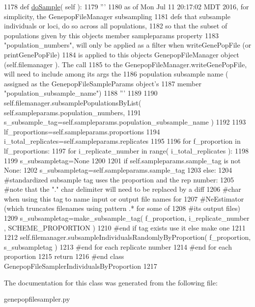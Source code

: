 \begin{DoxyCode}
1178     \textcolor{keyword}{def }\hyperlink{classnegui_1_1genepopfilesampler_1_1GenepopFileSamplerIndividualsByProportion_ad8170ea6661afa7bff72d484372209e3}{doSample}( self ):
1179         \textcolor{stringliteral}{'''}
1180 \textcolor{stringliteral}{        as of Mon Jul 11 20:17:02 MDT 2016, for simplicity, the GenepopFileManager subsampling}
1181 \textcolor{stringliteral}{        defs that subsample individuals or loci, do so across all populations,}
1182 \textcolor{stringliteral}{        so that the subset of populations given by this objects member sampleparams property }
1183 \textcolor{stringliteral}{        "population\_numbers", will only be applied as a filter when writeGenePopFile (or printGenePopFile)}
1184 \textcolor{stringliteral}{        is applied to this objects GenepopFileManager object (self.filemanager ). The call}
1185 \textcolor{stringliteral}{        to the GenepopFileManager.writeGenePopFile, will need to include among its args the }
1186 \textcolor{stringliteral}{        population subsample name ( assigned as the GenepopFileSampleParams object's}
1187 \textcolor{stringliteral}{        member "population\_subsample\_name") }
1188 \textcolor{stringliteral}{        '''}
1189 
1190         self.filemanager.subsamplePopulationsByList( self.sampleparams.population\_numbers, 
1191                 s\_subsample\_tag=self.sampleparams.population\_subsample\_name )
1192 
1193         lf\_proportions=self.sampleparams.proportions
1194         i\_total\_replicates=self.sampleparams.replicates
1195 
1196         \textcolor{keywordflow}{for} f\_proportion \textcolor{keywordflow}{in} lf\_proportions:
1197             \textcolor{keywordflow}{for} i\_replicate\_number \textcolor{keywordflow}{in} range( i\_total\_replicates ):
1198 
1199                 s\_subsampletag=\textcolor{keywordtype}{None}
1200 
1201                 \textcolor{keywordflow}{if} self.sampleparams.sample\_tag \textcolor{keywordflow}{is} \textcolor{keywordflow}{not} \textcolor{keywordtype}{None}:
1202                     s\_subsampletag=self.sampleparams.sample\_tag
1203                 \textcolor{keywordflow}{else}:
1204                     \textcolor{comment}{#standardized subsample tag uses the proportion and the rep number:}
1205                     \textcolor{comment}{#note that the "." char delimiter will need to be replaced by a diff}
1206                     \textcolor{comment}{#char when using this tag to name input or output file names for}
1207                     \textcolor{comment}{#NeEstimator (which truncates filenames using pattern .* for some of }
1208                     \textcolor{comment}{#its output files)}
1209                     s\_subsampletag=make\_subsample\_tag(  f\_proportion, i\_replicate\_number , 
      SCHEME\_PROPORTION )
1210                 \textcolor{comment}{#end if tag exists use it else make one}
1211 
1212                 self.filemanager.subsampleIndividualsRandomlyByProportion( f\_proportion, s\_subsampletag ) 
1213             \textcolor{comment}{#end for each replicate number  }
1214         \textcolor{comment}{#end for each proportion}
1215         \textcolor{keywordflow}{return}
1216 \textcolor{comment}{#end class GenepopFileSamplerIndividualsByProportion}
1217 
\end{DoxyCode}


The documentation for this class was generated from the following file\+:\begin{DoxyCompactItemize}
\item 
genepopfilesampler.\+py\end{DoxyCompactItemize}
